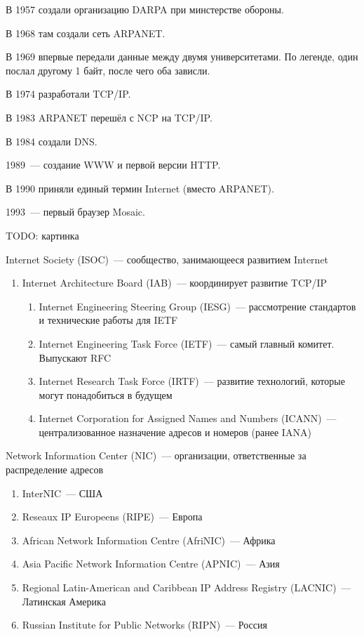 
В 1957 создали организацию DARPA при минстерстве обороны.

В 1968 там создали сеть ARPANET.

В 1969 впервые передали данные между двумя университетами. По легенде, один послал другому 1 байт, после чего оба зависли.

В 1974 разработали TCP/IP. 

В 1983 ARPANET перешёл с NCP на TCP/IP.

В 1984 создали DNS.

1989~--- создание WWW и первой версии HTTP.

В 1990 приняли единый термин Internet (вместо ARPANET).

1993~--- первый браузер Mosaic.


TODO: картинка



Internet Society (ISOC)~--- сообщество, занимающееся развитием Internet
\begin{enumerate}
    \item Internet Architecture Board (IAB)~--- координирует развитие TCP/IP
    \begin{enumerate}
        \item Internet Engineering Steering Group (IESG)~--- рассмотрение стандартов и технические работы для IETF
        \item Internet Engineering Task Force (IETF)~--- самый главный комитет. Выпускают RFC
        \item Internet Research Task Force (IRTF)~--- развитие технологий, которые могут понадобиться в будущем
        \item Internet Corporation for Assigned Names and Numbers (ICANN)~--- централизованное назначение адресов и номеров (ранее IANA)
    \end{enumerate}
\end{enumerate}


Network Information Center (NIC)~--- организации, ответственные за распределение адресов
\begin{enumerate}
    \item InterNIC~--- США
    \item Reseaux IP Europeens (RIPE)~--- Европа
    \item African Network Information Centre (AfriNIC)~--- Африка
    \item Asia Pacific Network Information Centre (APNIC)~--- Азия
    \item Regional Latin-American and Caribbean IP Address Registry (LACNIC)~--- Латинская Америка
    \item Russian Institute for Public Networks (RIPN)~--- Россия
\end{enumerate}


